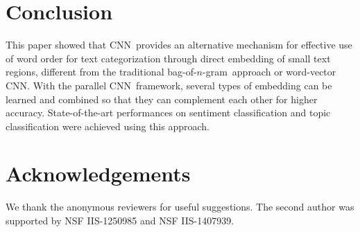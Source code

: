 \documentclass[11pt,letterpaper]{article}
\newcommand{\cnn}{CNN}
\newcommand{\bongram}{bag-of-$n$-gram}
\begin{document}
\section{Conclusion}
\label{sec:conclude}
This paper showed that \cnn\ provides an alternative mechanism for effective use of word order 
for text categorization through direct embedding of small text regions, 
different from the traditional \bongram\ approach or word-vector \cnn.  
With the parallel \cnn\ framework, several types of embedding 
can be learned and combined so that they can complement each other 
for higher accuracy.  
State-of-the-art performances on sentiment classification and topic classification were 
achieved using this approach. 

\section*{Acknowledgements}
We thank the anonymous reviewers for useful suggestions.  
The second author was supported by NSF IIS-1250985 and NSF IIS-1407939.  



\end{document}
